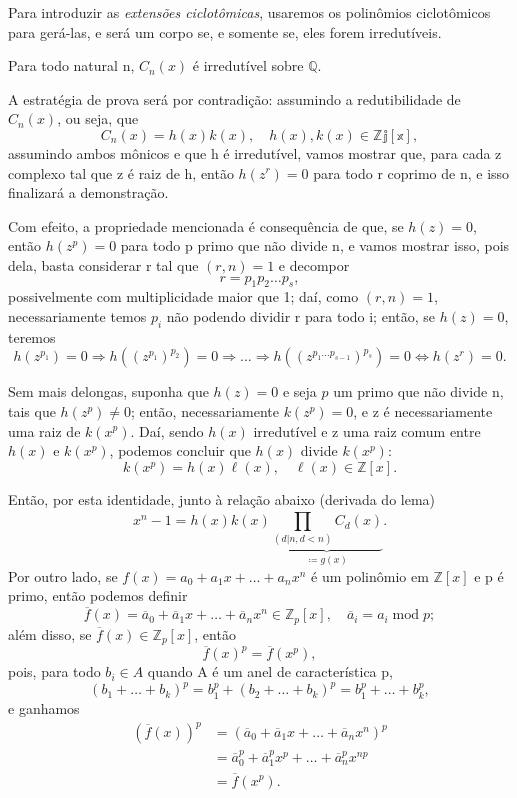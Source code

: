 \documentclass[../algebraIII_notes.tex]{subfiles}
\begin{document}
Para introduzir as \textit{extensões ciclotômicas}, usaremos os polinômios ciclotômicos para gerá-las, e será um corpo se, e somente se, eles forem irredutíveis.
\begin{theorem*}
	Para todo natural n, \(C_{n}(x)\) é irredutível sobre \(\mathbb{Q}\).
\end{theorem*}
\begin{proof*}
	A estratégia de prova será por contradição: assumindo a redutibilidade de \(C_{n}(x)\), ou seja, que
	\[
		C_{n}(x) = h(x)k(x), \quad h(x), k(x)\in \mathbb{Zj[x]},
	\]
	assumindo ambos mônicos e que h é irredutível, vamos mostrar que, para cada z complexo tal que z é raiz de h, então \(h(z^{r}) = 0\) para todo r coprimo de n, e isso finalizará a demonstração.

	Com efeito, a propriedade mencionada é consequência de que, se \(h(z) = 0\), então \(h(z^{p}) = 0\) para todo p primo que não divide n, e vamos mostrar isso, pois dela, basta considerar r tal que \((r, n)=1\) e decompor
	\[
		r = p_1 p_2 \dotsc p_s,
	\]
	possivelmente com multiplicidade maior que 1; daí, como \((r, n) = 1\), necessariamente temos \(p_{i}\) não podendo dividir r para todo i; então, se \(h(z) = 0\), teremos
	\[
		h(z^{p_1}) = 0 \Rightarrow h((z^{p_1})^{p_2}) = 0 \Rightarrow \dotsc \Rightarrow h((z^{p_1 \dotsc p_{s-1}})^{p_s}) = 0 \Longleftrightarrow h(z^{r}) = 0.
	\]

	Sem mais delongas, suponha que \(h(z) = 0\) e seja \(p\) um primo que não divide n, tais que \(h(z^{p}) \neq 0\); então, necessariamente \(k(z^{p})=0\), e z é necessariamente uma raiz de \(k(x^{p})\).
	Daí, sendo \(h(x)\) irredutível e z uma raiz comum entre \(h(x)\) e \(k(x^{p})\), podemos concluir que \(h(x)\) divide \(k(x^{p})\):
	\[
		k(x^{p}) = h(x)\ell (x), \quad \ell (x)\in \mathbb{Z}[x].
	\]

	Então, por esta identidade, junto à relação abaixo (derivada do lema)
	\[
		x^{n}-1 = h(x)k(x)\underbrace{\prod\limits_{(d|n, d<n)}^{}C_{d}(x)}_{\coloneqq g(x)}.
	\]
	Por outro lado, se \(f(x) = a_{0}+ a_1 x + \dotsc + a_{n}x^{n}\) é um polinômio em \(\mathbb{Z}[x]\) e p é primo, então podemos definir
	\[
		\overline{f}(x) = \overline{a}_{0} + \overline{a}_1x + \dotsc  + \overline{a}_{n}x^{n}\in \mathbb{Z}_{p}[x], \quad \overline{a}_{i} = a_{i}\;\mathrm{mod}\;p;
	\]
	além disso, se \(\overline{f}(x)\in \mathbb{Z}_{p}[x]\), então
	\[
		\overline{f}(x)^{p} = \overline{f}(x^{p}),
	\]
	pois, para todo \(b_{i}\in A\) quando A é um anel de característica p,
	\[
		(b_1 + \dotsc  + b_{k})^{p} = b_1^{p} + (b_2 + \dotsc +b_{k})^{p} = b_1^{p}+\dotsc +b_{k}^{p},
	\]
	e ganhamos
	\begin{align*}
		(\overline{f}(x))^{p} & = (\overline{a}_{0} + \overline{a}_1x + \dotsc  + \overline{a}_{n}x^{n})^{p}            \\
		                      & = \overline{a}_{0}^{p} + \overline{a}_1^{p}x^{p} + \dotsc  + \overline{a}_{n}^{p}x^{np} \\
		                      & = \overline{f}(x^{p}).
	\end{align*}


\end{proof*}
\end{document}
